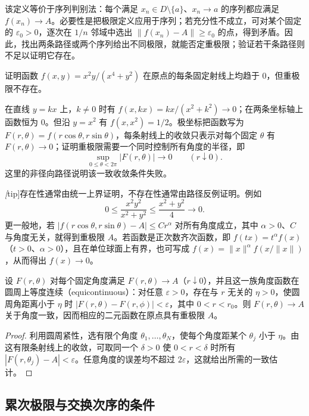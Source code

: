 该定义等价于序列判别法：每个满足 $x_n\in D\setminus\{a\}$、$x_n\to a$ 的序列都应满足 $f(x_n)\to A$。必要性是把极限定义应用于序列；若充分性不成立，可对某个固定的 $\varepsilon_0>0$，逐次在 $1/n$ 邻域中选出 $\|f(x_n)-A\|\ge\varepsilon_0$ 的点，得到矛盾。因此，找出两条路径或两个序列给出不同极限，就能否定重极限；验证若干条路径则不足以证明它存在。

\begin{example}
\label{ex:pei-radial-limit-failure}
证明函数 $f(x,y)=x^2y/(x^4+y^2)$ 在原点的每条固定射线上均趋于 $0$，但重极限不存在。
\end{example}
\begin{solve}
在直线 $y=kx$ 上，$k\ne0$ 时有 $f(x,kx)=kx/(x^2+k^2)\to0$；在两条坐标轴上函数恒为 $0$。但沿 $y=x^2$ 有 $f(x,x^2)=1/2$。极坐标把函数写为 $F(r,\theta)=f(r\cos\theta,r\sin\theta)$，每条射线上的收敛只表示对每个固定 $\theta$ 有 $F(r,\theta)\to0$；证明重极限需要一个同时控制所有角度的半径，即
\[
\sup_{0\le\theta<2\pi}|F(r,\theta)|\longrightarrow0\qquad(r\downarrow0).
\]
这里的非径向路径说明该一致收敛条件失败。
\end{solve}

\emph[tip]{存在性通常由统一上界证明，不存在性通常由路径反例证明。}例如
\[
0\le\frac{x^2y^2}{x^2+y^2}\le\frac{x^2+y^2}{4}\longrightarrow0.
\]
更一般地，若 $|f(r\cos\theta,r\sin\theta)-A|\le Cr^\alpha$ 对所有角度成立，其中 $\alpha>0$、$C$ 与角度无关，就得到重极限 $A$。若函数是正次数齐次函数，即 $f(tx)=t^\alpha f(x)$（$t>0$、$\alpha>0$），且在单位球面上有界，也可写成 $f(x)=\|x\|^\alpha f(x/\|x\|)$，从而得出 $f(x)\to0$。

\begin{proposition}
设 $F(r,\theta)$ 对每个固定角度满足 $F(r,\theta)\to A$（$r\downarrow0$），并且这一族角度函数在圆周上等度连续（equicontinuous）：对任意 $\varepsilon>0$，存在与 $r$ 无关的 $\eta>0$，使圆周角距离小于 $\eta$ 时 $|F(r,\theta)-F(r,\phi)|<\varepsilon$，其中 $0<r<r_0$。则 $F(r,\theta)\to A$ 关于角度一致，因而相应的二元函数在原点具有重极限 $A$。
\end{proposition}
\begin{proof}
利用圆周紧性，选有限个角度 $\theta_1,\ldots,\theta_N$，使每个角度距某个 $\theta_j$ 小于 $\eta$。由这有限条射线上的收敛，可取同一个 $\delta>0$ 使 $0<r<\delta$ 时所有 $|F(r,\theta_j)-A|<\varepsilon$。任意角度的误差均不超过 $2\varepsilon$，这就给出所需的一致估计。
\end{proof}

\subsection{累次极限与交换次序的条件}

